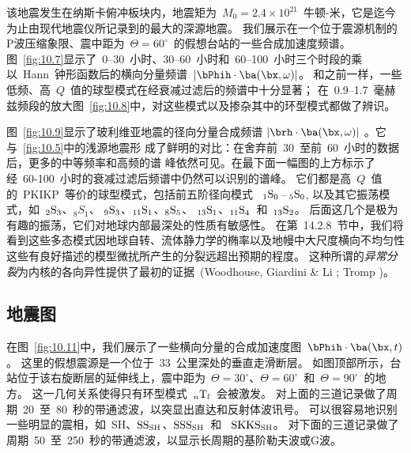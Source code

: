 该地震发生在纳斯卡俯冲板块内，地震矩为~$M_0=2.4\times 10^{21}$~牛顿-米，它是迄今为止由现代地震仪所记录到的最大的深源地震。
我们展示在一个位于震源机制的P波压缩象限、震中距为~$\Theta=60^\circ$~的假想台站的一些合成加速度频谱。
图~\ref{fig:10.7}显示了~0--30~小时、30--60~小时和~60--100~小时三个时段的乘以~Hann~钟形函数后的横向分量频谱~$|\bPhih\cdot\ba(\bx,\omega)|$。
和之前一样，一些低频、高~$Q$~值的球型模式在经衰减过滤后的频谱中十分显著；
在~0.9--1.7~毫赫兹频段的放大图~\ref{fig:10.8}中，对这些模式以及掺杂其中的环型模式都做了辨识。

图~\ref{fig:10.9}显示了玻利维亚地震的径向分量合成频谱 $|\brh\cdot\ba(\bx,\omega)|$ 。它与~\ref{fig:10.5}中的浅源地震形
成了鲜明的对比：在舍弃前~30~至前~60~小时的数据后，更多的中等频率和高频的谱
峰依然可见。在最下面一幅图的上方标示了经~60-100~小时的衰减过滤后频谱中仍然可以识别的谱峰。
它们都是高~$Q$~值的~PKIKP~等价的球型模式，包括前五阶径向模式
~${}_1{\rm S}_0\,$--$\,{}_5{\rm S}_0$, 以及其它振荡模式，如~${}_2{\rm S}_3$、${}_8S_1$、
${}_9{\rm S}_3$、${}_{11}{\rm S}_1$、${}_8{\rm S}_5$、
${}_{13}{\rm S}_1$、${}_{11}{\rm S}_4$~和~${}_{13}{\rm S}_2$。
后面这几个是极为有趣的振荡，它们对地球内部最深处的性质有敏感性。
在第~14.2.8~节中，我们将看到这些多态模式因地球自转、流体静力学的椭率以及地幔中大尺度横向不均匀性这些有良好描述的模型微扰所产生的分裂远超出预期的程度。
这种所谓的{\em 异常分裂}为内核的各向异性提供了最初的证据~(Woodhouse,
Giardini \& Li \citeyear{woodhouse&al86}; Tromp \citeyear{tromp93})。
%
%
%
%

\subsection{地震图}
%
%

在图~\ref{fig:10.11}中，我们展示了一些横向分量的合成加速度图~$\bPhih\cdot\ba(\bx,t)$。
这里的假想震源是一个位于~33~公里深处的垂直走滑断层。
如图顶部所示，台站位于该右旋断层的延伸线上，震中距为~$\Theta=30^\circ$、$\Theta=60^\circ$~和~$\Theta=90^\circ$~的地方。
这一几何关系使得只有环型模式~${}_n{\rm T}_l$~会被激发。
对上面的三道记录做了周期~20~至~80~秒的带通滤波，以突显出直达和反射体波讯号。
可以很容易地识别一些明显的震相，如~SH、${\rm SS}_{\rm SH}$、${\rm SSS}_{\rm SH}$~和
~${\rm SKKS}_{\rm SH}$。
对下面的三道记录做了周期~50~至~250~秒的带通滤波，以显示长周期的基阶勒夫波或G波。


